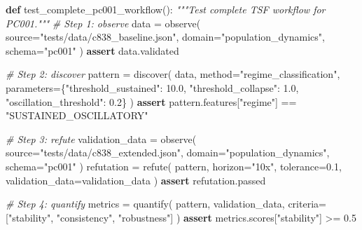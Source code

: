 \documentclass[
]{article}
\newenvironment{Shaded}{}{}
\newcommand{\CommentTok}[1]{\textcolor[rgb]{0.38,0.63,0.69}{\textit{#1}}}
\newcommand{\ControlFlowTok}[1]{\textcolor[rgb]{0.00,0.44,0.13}{\textbf{#1}}}
\newcommand{\FloatTok}[1]{\textcolor[rgb]{0.25,0.63,0.44}{#1}}
\newcommand{\KeywordTok}[1]{\textcolor[rgb]{0.00,0.44,0.13}{\textbf{#1}}}
\newcommand{\NormalTok}[1]{#1}
\newcommand{\OperatorTok}[1]{\textcolor[rgb]{0.40,0.40,0.40}{#1}}
\newcommand{\StringTok}[1]{\textcolor[rgb]{0.25,0.44,0.63}{#1}}
\begin{document}
\begin{Shaded}
\begin{Highlighting}[]
\KeywordTok{def}\NormalTok{ test\_complete\_pc001\_workflow():}
    \CommentTok{"""Test complete TSF workflow for PC001."""}
    \CommentTok{\# Step 1: observe}
\NormalTok{    data }\OperatorTok{=}\NormalTok{ observe(}
\NormalTok{        source}\OperatorTok{=}\StringTok{"tests/data/c838\_baseline.json"}\NormalTok{,}
\NormalTok{        domain}\OperatorTok{=}\StringTok{"population\_dynamics"}\NormalTok{,}
\NormalTok{        schema}\OperatorTok{=}\StringTok{"pc001"}
\NormalTok{    )}
    \ControlFlowTok{assert}\NormalTok{ data.validated}

    \CommentTok{\# Step 2: discover}
\NormalTok{    pattern }\OperatorTok{=}\NormalTok{ discover(}
\NormalTok{        data,}
\NormalTok{        method}\OperatorTok{=}\StringTok{"regime\_classification"}\NormalTok{,}
\NormalTok{        parameters}\OperatorTok{=}\NormalTok{\{}\StringTok{"threshold\_sustained"}\NormalTok{: }\FloatTok{10.0}\NormalTok{, }\StringTok{"threshold\_collapse"}\NormalTok{: }\FloatTok{1.0}\NormalTok{, }\StringTok{"oscillation\_threshold"}\NormalTok{: }\FloatTok{0.2}\NormalTok{\}}
\NormalTok{    )}
    \ControlFlowTok{assert}\NormalTok{ pattern.features[}\StringTok{"regime"}\NormalTok{] }\OperatorTok{==} \StringTok{"SUSTAINED\_OSCILLATORY"}

    \CommentTok{\# Step 3: refute}
\NormalTok{    validation\_data }\OperatorTok{=}\NormalTok{ observe(}
\NormalTok{        source}\OperatorTok{=}\StringTok{"tests/data/c838\_extended.json"}\NormalTok{,}
\NormalTok{        domain}\OperatorTok{=}\StringTok{"population\_dynamics"}\NormalTok{,}
\NormalTok{        schema}\OperatorTok{=}\StringTok{"pc001"}
\NormalTok{    )}
\NormalTok{    refutation }\OperatorTok{=}\NormalTok{ refute(}
\NormalTok{        pattern,}
\NormalTok{        horizon}\OperatorTok{=}\StringTok{"10x"}\NormalTok{,}
\NormalTok{        tolerance}\OperatorTok{=}\FloatTok{0.1}\NormalTok{,}
\NormalTok{        validation\_data}\OperatorTok{=}\NormalTok{validation\_data}
\NormalTok{    )}
    \ControlFlowTok{assert}\NormalTok{ refutation.passed}

    \CommentTok{\# Step 4: quantify}
\NormalTok{    metrics }\OperatorTok{=}\NormalTok{ quantify(}
\NormalTok{        pattern,}
\NormalTok{        validation\_data,}
\NormalTok{        criteria}\OperatorTok{=}\NormalTok{[}\StringTok{"stability"}\NormalTok{, }\StringTok{"consistency"}\NormalTok{, }\StringTok{"robustness"}\NormalTok{]}
\NormalTok{    )}
    \ControlFlowTok{assert}\NormalTok{ metrics.scores[}\StringTok{"stability"}\NormalTok{] }\OperatorTok{\textgreater{}=} \FloatTok{0.5}


\end{Highlighting}
\end{Shaded}
\end{document}
